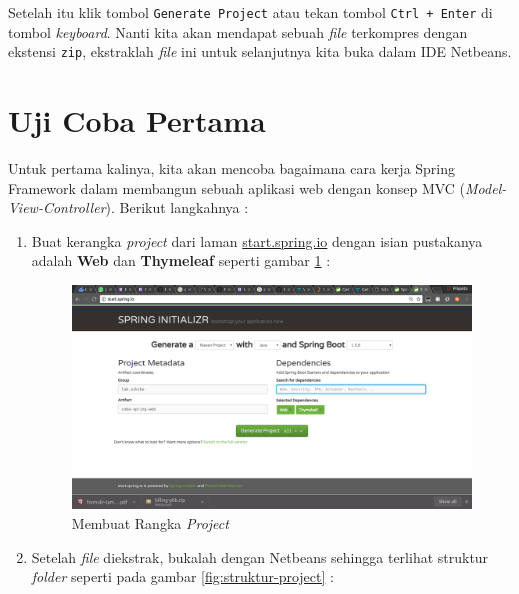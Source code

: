 Setelah itu klik tombol \texttt{Generate Project} atau tekan tombol \texttt{Ctrl + Enter} di tombol \textit{keyboard}. Nanti kita akan mendapat sebuah \textit{file} terkompres dengan ekstensi \texttt{zip}, ekstraklah \textit{file} ini untuk selanjutnya kita buka dalam IDE Netbeans.

\section{Uji Coba Pertama}

Untuk pertama kalinya, kita akan mencoba bagaimana cara kerja Spring Framework dalam membangun sebuah aplikasi web dengan konsep MVC (\textit{Model-View-Controller}). Berikut langkahnya :

\begin{enumerate}
	\item Buat kerangka \textit{project} dari laman \url{start.spring.io} dengan isian pustakanya adalah \textbf{Web} dan \textbf{Thymeleaf} seperti gambar \ref{fig:create-spring} :
	
	\begin{figure}[H]
		\centering
		\includegraphics[width=1\textwidth]{./resources/002-create-spring}
		\caption{Membuat Rangka \textit{Project}}
		\label{fig:create-spring}
	\end{figure}
	
	\item Setelah \textit{file} diekstrak, bukalah dengan Netbeans sehingga terlihat struktur \textit{folder} seperti pada gambar \ref{fig:struktur-project} :
	

\end{enumerate}
